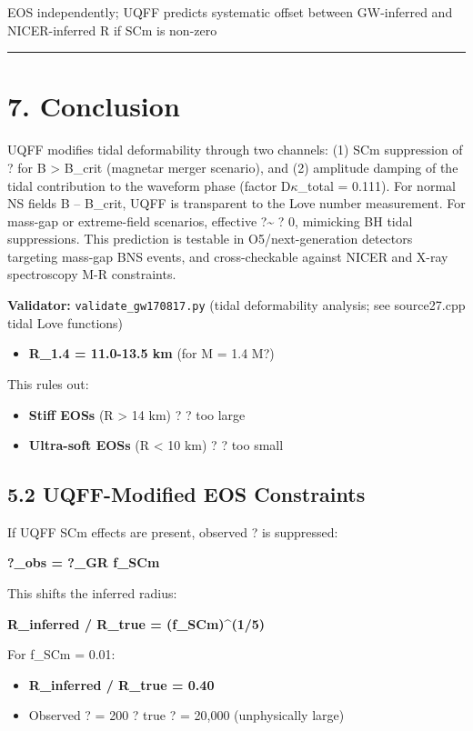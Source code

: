 \documentclass[11pt]{article}
\begin{document}
EOS independently; UQFF predicts systematic offset between GW-inferred and NICER-inferred R if SCm is non-zero

\noindent\rule{\textwidth}{0.4pt}

\section*{7. Conclusion}

UQFF modifies tidal deformability through two channels: (1) SCm suppression of ? for B > B\_crit (magnetar merger scenario), and (2) amplitude damping of the tidal contribution to the waveform phase (factor D$\kappa$\_total = 0.111). For normal NS fields B -- B\_crit, UQFF is transparent to the Love number measurement. For mass-gap or extreme-field scenarios, effective ?\textasciitilde{} ? 0, mimicking BH tidal suppressions. This prediction is testable in O5/next-generation detectors targeting mass-gap BNS events, and cross-checkable against NICER and X-ray spectroscopy M-R constraints.

\textbf{Validator:} \verb|validate_gw170817.py| (tidal deformability analysis; see source27.cpp tidal Love functions)

\begin{itemize}
  \item \textbf{R\_1.4 = 11.0-13.5 km} (for M = 1.4 M?)
\end{itemize}

This rules out:

\begin{itemize}
  \item \textbf{Stiff EOSs} (R > 14 km) ? ? too large
  \item \textbf{Ultra-soft EOSs} (R < 10 km) ? ? too small
\end{itemize}

\subsection*{5.2 UQFF-Modified EOS Constraints}

If UQFF SCm effects are present, observed ? is suppressed:

\textbf{?\_obs = ?\_GR  f\_SCm}

This shifts the inferred radius:

\textbf{R\_inferred / R\_true = (f\_SCm)\textasciicircum{}(1/5)}

For f\_SCm = 0.01:

\begin{itemize}
  \item \textbf{R\_inferred / R\_true = 0.40}
  \item Observed ? = 200 ? true ? = 20,000 (unphysically large)
\end{itemize}
\end{document}
